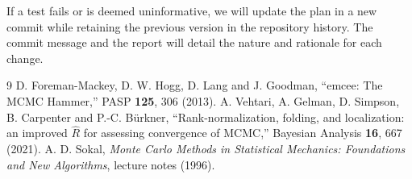 \documentclass[11pt]{article}
\begin{document}
If a test fails or is deemed uninformative, we will update the plan in a new commit while retaining the previous version in the repository history. The commit message and the report will detail the nature and rationale for each change.


\begin{thebibliography}{9}
 D. Foreman-Mackey, D. W. Hogg, D. Lang and J. Goodman, ``emcee: The MCMC Hammer,'' PASP \textbf{125}, 306 (2013).
 A. Vehtari, A. Gelman, D. Simpson, B. Carpenter and P.-C. B\"urkner, ``Rank-normalization, folding, and localization: an improved $\hat R$ for assessing convergence of MCMC,'' Bayesian Analysis \textbf{16}, 667 (2021).
 A. D. Sokal, \emph{Monte Carlo Methods in Statistical Mechanics: Foundations and New Algorithms}, lecture notes (1996).
\end{thebibliography}
\end{document}
